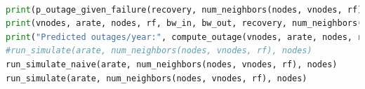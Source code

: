 \documentclass{article}
\begin{document}
\begin{lstlisting}[language=Python]
    
print(p_outage_given_failure(recovery, num_neighbors(nodes, vnodes, rf), arate))
print(vnodes, arate, nodes, rf, bw_in, bw_out, recovery, num_neighbors(nodes, vnodes, rf))
print("Predicted outages/year:", compute_outage(vnodes, arate, nodes, rf, bw_in, bw_out))
#run_simulate(arate, num_neighbors(nodes, vnodes, rf), nodes)
run_simulate_naive(arate, num_neighbors(nodes, vnodes, rf), nodes)
run_simulate(arate, num_neighbors(nodes, vnodes, rf), nodes)
\end{lstlisting}
\end{document}
